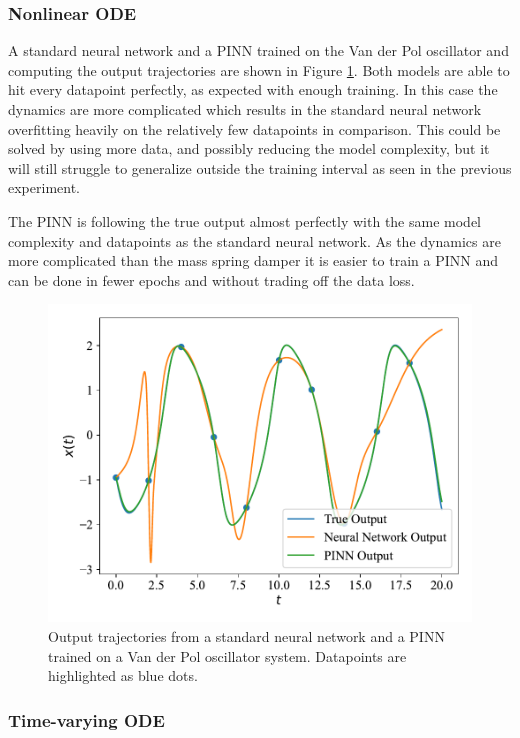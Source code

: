 \subsubsection{Nonlinear ODE}

A standard neural network and a PINN trained on the Van der Pol oscillator and computing the output trajectories are shown in Figure \ref{fig:vdp}. Both models are able to hit every datapoint perfectly, as expected with enough training. In this case the dynamics are more complicated which results in the standard neural network overfitting heavily on the relatively few datapoints in comparison. This could be solved by using more data, and possibly reducing the model complexity, but it will still struggle to generalize outside the training interval as seen in the previous experiment.

The PINN is following the true output almost perfectly with the same model complexity and datapoints as the standard neural network. As the dynamics are more complicated than the mass spring damper it is easier to train a PINN and can be done in fewer epochs and without trading off the data loss.

\begin{figure}[H]
    \centering
    \includegraphics[width=1.0\linewidth]{Figures/InitialExperiments/vdp.pdf}
    \caption{Output trajectories from a standard neural network and a PINN trained on a Van der Pol oscillator system. Datapoints are highlighted as blue dots.}
    \label{fig:vdp}
\end{figure}

\subsubsection{Time-varying ODE}

